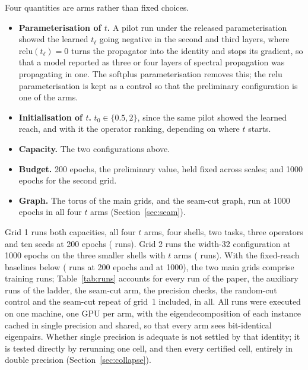 \documentclass[preprint,11pt,3p]{elsarticle}
\begin{document}
Four quantities are arms rather than fixed choices.
\begin{itemize}
\item \textbf{Parameterisation of $t$.} A pilot run under the released parameterisation showed the
  learned $t_{\ell}$ going negative in the second and third layers, where
  $\mathrm{relu}(t_{\ell})=0$ turns the propagator into the identity and stops its gradient, so
  that a model reported as three or four layers of spectral propagation was propagating in one.
  The softplus parameterisation removes this; the relu parameterisation is kept as a control so
  that the preliminary configuration is one of the arms.
\item \textbf{Initialisation of $t$.} $t_{0}\in\{0.5, 2\}$, since the same pilot showed the
  learned reach, and with it the operator ranking, depending on where $t$ starts.
\item \textbf{Capacity.} The two configurations above.
\item \textbf{Budget.} 200 epochs, the preliminary value, held fixed across scales; and 1000
  epochs for the second grid.
\item \textbf{Graph.} The torus of the main grids, and the seam-cut graph, run at 1000 epochs in
  all four $t$ arms (Section~\ref{sec:seam}).
\end{itemize}
Grid 1 runs both capacities, all four $t$ arms, four shells, two tasks, three operators and ten
seeds at 200 epochs (\numGridTwelveRuns{} runs). Grid 2 runs the width-32 configuration at 1000
epochs on the three smaller shells with \numGridThreeArms{} $t$ arms (\numGridThreeRuns{} runs).
With the fixed-reach baselines below (\numFixedRunsTwelve{} runs at 200 epochs and
\numFixedRunsThree{} at 1000), the two main grids comprise \numTotalRuns{} training runs;
Table~\ref{tab:runs} accounts for every run of the paper, the \numAuxRuns{} auxiliary runs of
the ladder, the seam-cut arm, the precision checks, the random-cut control and the seam-cut
repeat of grid~1 included, \numGrandRuns{} in all. All runs were executed on one machine, one
GPU per arm, with the eigendecomposition of each instance cached in single precision and shared,
so that every arm sees bit-identical eigenpairs. Whether single precision is adequate is not
settled by that identity; it is tested directly by rerunning one cell, and then every certified
cell, entirely in double precision (Section~\ref{sec:collapse}).

\begin{table}[htbp]
\centering
\caption{Every training run of the paper, by component; the auxiliary total and the grand total
are stated here and cited from here.}
\label{tab:runs}

\end{table}
\end{document}
